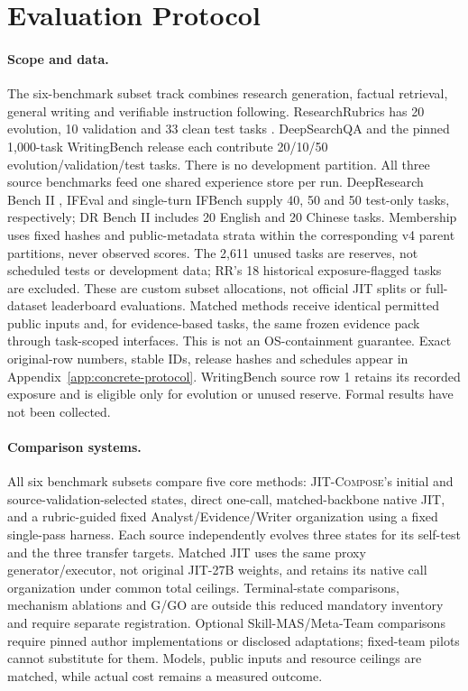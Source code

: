 \documentclass[11pt]{article}
\newcommand{\method}{\mbox{\textsc{JIT-Compose}}}
\begin{document}
\section{Evaluation Protocol}
\label{sec:evaluation}

\paragraph{Scope and data.}
The six-benchmark subset track combines research generation, factual retrieval, general writing and verifiable instruction following. ResearchRubrics has 20 evolution, 10 validation and 33 clean test tasks \citep{sharma2025researchrubrics}. DeepSearchQA and the pinned 1,000-task WritingBench release each contribute 20/10/50 evolution/validation/test tasks. There is no development partition. All three source benchmarks feed one shared experience store per run. DeepResearch Bench II \citep{li2026drbench2}, IFEval and single-turn IFBench supply 40, 50 and 50 test-only tasks, respectively; DR Bench II includes 20 English and 20 Chinese tasks. Membership uses fixed hashes and public-metadata strata within the corresponding v4 parent partitions, never observed scores. The 2,611 unused tasks are reserves, not scheduled tests or development data; RR's 18 historical exposure-flagged tasks are excluded. These are custom subset allocations, not official JIT splits or full-dataset leaderboard evaluations. Matched methods receive identical permitted public inputs and, for evidence-based tasks, the same frozen evidence pack through task-scoped interfaces. This is not an OS-containment guarantee. Exact original-row numbers, stable IDs, release hashes and schedules appear in Appendix~\ref{app:concrete-protocol}. WritingBench source row 1 retains its recorded exposure and is eligible only for evolution or unused reserve. Formal results have not been collected.

\paragraph{Comparison systems.}
All six benchmark subsets compare five core methods: \method's initial and source-validation-selected states, direct one-call, matched-backbone native JIT, and a rubric-guided fixed Analyst/Evidence/Writer organization using a fixed single-pass harness. Each source independently evolves three states for its self-test and the three transfer targets. Matched JIT uses the same proxy generator/executor, not original JIT-27B weights, and retains its native call organization under common total ceilings. Terminal-state comparisons, mechanism ablations and G/GO are outside this reduced mandatory inventory and require separate registration. Optional Skill-MAS/Meta-Team comparisons require pinned author implementations or disclosed adaptations; fixed-team pilots cannot substitute for them. Models, public inputs and resource ceilings are matched, while actual cost remains a measured outcome.
\end{document}
